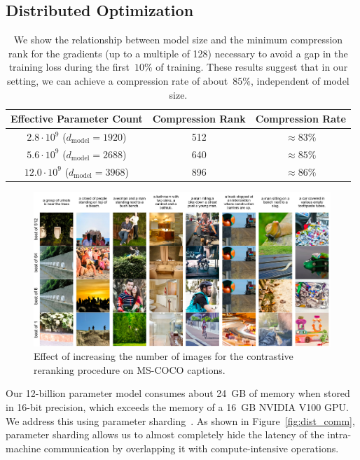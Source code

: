 \documentclass{article}
\begin{document}
\subsection{Distributed Optimization}
\label{sec:dist_opt}
%
\begin{table}[]
    \centering\scriptsize
    \begin{tabular}{ccc}
        \toprule
         Effective Parameter Count & Compression Rank & Compression Rate \\
         \midrule
         $2.8 \cdot 10^9$ ($d_{\mathrm{model}} = 1920$) & 512 & $\approx\! 83\%$ \\
         $5.6 \cdot 10^9$ ($d_{\mathrm{model}} = 2688$) & 640 & $\approx\! 85\%$ \\
         $12.0 \cdot 10^9$ ($d_{\mathrm{model}} = 3968$) & 896 & $\approx\! 86\%$ \\
         \bottomrule
    \end{tabular}
    \caption{We show the relationship between model size and the minimum compression rank for the gradients (up to a multiple of 128) necessary to avoid a gap in the training loss during the first~$10\%$ of training. These results suggest that in our setting, we can achieve a compression rate of about~$85\%$, independent of model size.}
    \label{tab:cmp_rank}
\end{table}
%
\begin{figure}[t]
    \centering
    \includegraphics[width=\linewidth]{coco_reranking.jpg}
    \caption{Effect of increasing the number of images for the contrastive reranking procedure on MS-COCO captions.}
    \label{fig:coco_reranking}
\end{figure}
%
Our 12-billion parameter model consumes about 24~GB of memory when stored in 16-bit precision, which exceeds the memory of a 16~GB NVIDIA V100 GPU. We address this using parameter sharding~\cite{rajbhandari2019zero}. As shown in Figure~\ref{fig:dist_comm}, parameter sharding allows us to almost completely hide the latency of the intra-machine communication by overlapping it with compute-intensive operations.
\end{document}
